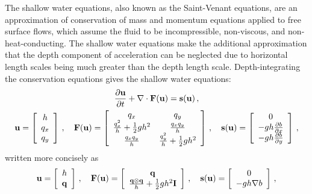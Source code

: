 The shallow water equations, also known as the Saint-Venant equations, are an
approximation of conservation of mass and momentum equations applied to free
surface flows, which assume the fluid to be incompressible, non-viscous, and
non-heat-conducting. The shallow water equations make the additional
approximation that the depth component of acceleration can be neglected due to
horizontal length scales being much greater than the depth length
scale. Depth-integrating the conservation equations gives the shallow
water equations\cite{toro2009}\cite{leveque2002}:
\begin{equation}
\begin{gathered}
  \ppt{\vectorsolution} + \nabla\cdot\consfluxvector(\vectorsolution)
  = \conssource(\vectorsolution) \eqc
\\
  \vectorsolution
    = \left[\begin{array}{c}
        \height\\
        \heightmomentumx\\
        \heightmomentumy
      \end{array}\right]
  \eqc\quad
  \consfluxvector(\vectorsolution)
  = \left[\begin{array}{c c}
      \heightmomentumx & \heightmomentumy\\
      \frac{\heightmomentumx^2}{\height} + \half\gravity\height^2
        & \frac{\heightmomentumx\heightmomentumy}{\height}\\
      \frac{\heightmomentumx\heightmomentumy}{\height}
        & \frac{\heightmomentumy^2}{\height} + \half\gravity\height^2\\
    \end{array}\right]
  \eqc\quad
  \conssource(\vectorsolution)
  = \left[\begin{array}{c}
      0\\
     -\gravity\height\pd{\bathymetry}{x}\\
     -\gravity\height\pd{\bathymetry}{y}\\
    \end{array}\right]
  \eqc
\end{gathered}
\end{equation}
written more concisely as
\[
  \vectorsolution
    = \left[\begin{array}{c}\height\\\heightmomentum\end{array}\right]
  \eqc\quad
  \consfluxvector(\vectorsolution)
  = \left[\begin{array}{c}\heightmomentum\\
      \frac{\heightmomentum\otimes\heightmomentum}{\height}
      + \half\gravity\height^2\identity
    \end{array}\right]
  \eqc\quad
  \conssource(\vectorsolution)
  = \left[\begin{array}{c}0\\-\gravity\height\nabla\bathymetry\end{array}
    \right] \eqc
\]
